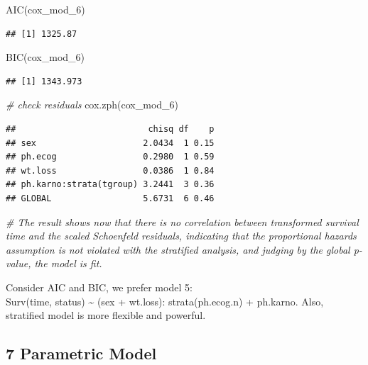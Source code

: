 \documentclass[
]{article}
\newenvironment{Shaded}{\begin{snugshade}}{\end{snugshade}}
\newcommand{\CommentTok}[1]{\textcolor[rgb]{0.56,0.35,0.01}{\textit{#1}}}
\newcommand{\FunctionTok}[1]{\textcolor[rgb]{0.00,0.00,0.00}{#1}}
\newcommand{\NormalTok}[1]{#1}
\begin{document}
\begin{Shaded}
\begin{Highlighting}[]
\FunctionTok{AIC}\NormalTok{(cox\_mod\_6)}
\end{Highlighting}
\end{Shaded}

\begin{verbatim}
## [1] 1325.87
\end{verbatim}

\begin{Shaded}
\begin{Highlighting}[]
\FunctionTok{BIC}\NormalTok{(cox\_mod\_6)}
\end{Highlighting}
\end{Shaded}

\begin{verbatim}
## [1] 1343.973
\end{verbatim}

\begin{Shaded}
\begin{Highlighting}[]
\CommentTok{\# check residuals}
\FunctionTok{cox.zph}\NormalTok{(cox\_mod\_6)}
\end{Highlighting}
\end{Shaded}

\begin{verbatim}
##                          chisq df    p
## sex                     2.0434  1 0.15
## ph.ecog                 0.2980  1 0.59
## wt.loss                 0.0386  1 0.84
## ph.karno:strata(tgroup) 3.2441  3 0.36
## GLOBAL                  5.6731  6 0.46
\end{verbatim}

\begin{Shaded}
\begin{Highlighting}[]
\CommentTok{\# The result shows now that there is no correlation between transformed survival time and the scaled Schoenfeld residuals, indicating that the proportional hazards assumption is not violated with the stratified analysis, and judging by the global p{-}value, the model is fit.}
\end{Highlighting}
\end{Shaded}

Consider AIC and BIC, we prefer model 5:\\
Surv(time, status) \textasciitilde{} (sex + wt.loss): strata(ph.ecog.n)
+ ph.karno. Also, stratified model is more flexible and powerful.

\hypertarget{parametric-model}{%
\subsection{7 Parametric Model}\label{parametric-model}}
\end{document}
